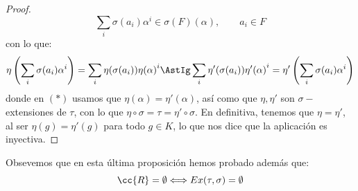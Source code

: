 \begin{prop}
\begin{proof}
        \begin{equation*}
            \sum_{i} \sigma(a_i) \alpha^i \in \sigma(F)(\alpha), \qquad a_i \in F
        \end{equation*}
        con lo que:
        \begin{equation*}
            \eta\left(\sum_{i}\sigma(a_i)\alpha^i\right) = \sum_i \eta(\sigma(a_i)) {\eta(\alpha)}^{i} \AstIg \sum_i \eta'(\sigma(a_i)) {\eta'(\alpha)}^{i} = \eta'\left(\sum_{i}\sigma(a_i)\alpha^i\right) 
        \end{equation*}
        donde en $(\ast)$ usamos que $\eta(\alpha) = \eta'(\alpha)$, así como que $\eta, \eta'$ son $\sigma-$extensiones de $\tau$, con lo que $\eta\circ \sigma = \tau = \eta'\circ \sigma$. En definitiva, tenemos que $\eta = \eta'$, al ser $\eta(g) = \eta'(g)$ para todo $g\in K$, lo que nos dice que la aplicación es inyectiva.
    \end{proof}
\end{prop}

\noindent
Obsevemos que en esta última proposición hemos probado además que:
\begin{equation*}
    \cc{R}= \emptyset  \Longleftrightarrow Ex(\tau,\sigma) =  \emptyset 
\end{equation*}

